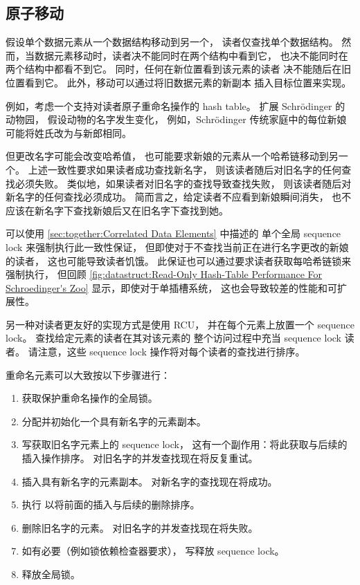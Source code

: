\subsection{原子移动}
\label{sec:together:Atomic Move}

假设单个数据元素从一个数据结构移动到另一个，
读者仅查找单个数据结构。
然而，当数据元素移动时，读者决不能同时在两个结构中看到它，
也决不能同时在两个结构中都看不到它。
同时，任何在新位置看到该元素的读者
决不能随后在旧位置看到它。
此外，移动可以通过将旧数据元素的新副本
插入目标位置来实现。

例如，考虑一个支持对读者原子重命名操作的 hash table。
扩展 Schr\"odinger 的动物园，
假设动物的名字发生变化，
例如，Schr\"odinger 传统家庭中的每位新娘
可能将姓氏改为与新郎相同。

但更改名字可能会改变哈希值，
也可能要求新娘的元素从一个哈希链移动到另一个。
上述一致性要求如果读者成功查找新名字，
则该读者随后对旧名字的任何查找必须失败。
类似地，如果读者对旧名字的查找导致查找失败，
则该读者随后对新名字的任何查找必须成功。
简而言之，给定读者不应看到新娘瞬间消失，
也不应该在新名字下查找新娘后又在旧名字下查找到她。

可以使用 \cref{sec:together:Correlated Data Elements} 中描述的
单个全局 sequence lock 来强制执行此一致性保证，
但即使对于不查找当前正在进行名字更改的新娘的读者，
这也可能导致读者饥饿。
此保证也可以通过要求读者获取每哈希链锁来强制执行，
但回顾
\cref{fig:datastruct:Read-Only Hash-Table Performance For Schroedinger's Zoo}
显示，即使对于单插槽系统，
这也会导致较差的性能和可扩展性。

另一种对读者更友好的实现方式是使用 RCU，
并在每个元素上放置一个 sequence lock。
查找给定元素的读者在其对该元素的
整个访问过程中充当 sequence lock 读者。
请注意，这些 sequence lock 操作将对每个读者的查找进行排序。

重命名元素可以大致按以下步骤进行：

\begin{enumerate}
\item	获取保护重命名操作的全局锁。
\item	分配并初始化一个具有新名字的元素副本。
\item	写获取旧名字元素上的 sequence lock，
	这有一个副作用：将此获取与后续的插入操作排序。
	对旧名字的并发查找现在将反复重试。
\item	插入具有新名字的元素副本。
	对新名字的查找现在将成功。
\item	执行  以将前面的插入与后续的删除排序。
\item	删除旧名字的元素。
	对旧名字的并发查找现在将失败。
\item	如有必要（例如锁依赖检查器要求），
	写释放 sequence lock。
\item	释放全局锁。
\end{enumerate}

